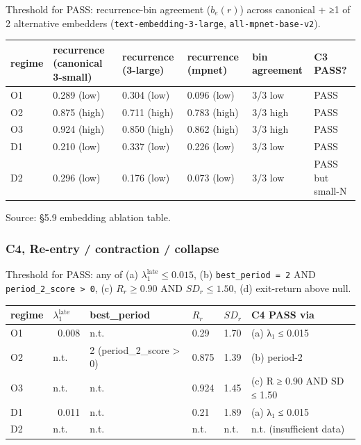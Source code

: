 \documentclass{article}
\theoremstyle{plain}
\theoremstyle{definition}
\begin{document}
Threshold for PASS: recurrence-bin agreement ($b_e(r)$) across
canonical + ≥1 of 2 alternative embedders (\texttt{text-embedding-3-large},
\texttt{all-mpnet-base-v2}).

\begin{table}[h!]
\centering
\small
\begin{tabularx}{\textwidth}{lYYYYY}
\toprule
regime & recurrence (canonical 3-small) & recurrence (3-large) & recurrence (mpnet) & bin agreement & C3 PASS? \\
\midrule
O1 & 0.289 (low) & 0.304 (low) & 0.096 (low) & 3/3 low & PASS \\
O2 & 0.875 (high) & 0.711 (high) & 0.783 (high) & 3/3 high & PASS \\
O3 & 0.924 (high) & 0.850 (high) & 0.862 (high) & 3/3 high & PASS \\
D1 & 0.210 (low) & 0.337 (low) & 0.226 (low) & 3/3 low & PASS \\
D2 & 0.296 (low) & 0.176 (low) & 0.073 (low) & 3/3 low & PASS but small-N \\
\bottomrule
\end{tabularx}
\end{table}

Source: §5.9 embedding ablation table.

\subsubsection*{C4, Re-entry / contraction / collapse}

Threshold for PASS: any of (a) $\lambda_1^{\text{late}} \le 0.015$,
(b) \texttt{best\_period = 2} AND \texttt{period\_2\_score > 0}, (c) $R_r \ge 0.90$
AND $SD_r \le 1.50$, (d) exit-return above null.

\begin{table}[h!]
\centering
\small
\begin{tabularx}{\textwidth}{lYYYYY}
\toprule
regime & $\lambda_1^{\text{late}}$ & best\_period & $R_r$ & $SD_r$ & C4 PASS via \\
\midrule
O1 & ~0.008 & n.t. & 0.29 & 1.70 & (a) λ₁ ≤ 0.015 \\
O2 & n.t. & 2 (period\_2\_score > 0) & 0.875 & 1.39 & (b) period-2 \\
O3 & n.t. & n.t. & 0.924 & 1.45 & (c) R ≥ 0.90 AND SD ≤ 1.50 \\
D1 & ~0.011 & n.t. & 0.21 & 1.89 & (a) λ₁ ≤ 0.015 \\
D2 & n.t. & n.t. & n.t. & n.t. & n.t. (insufficient data) \\
\bottomrule
\end{tabularx}
\end{table}
\end{document}
